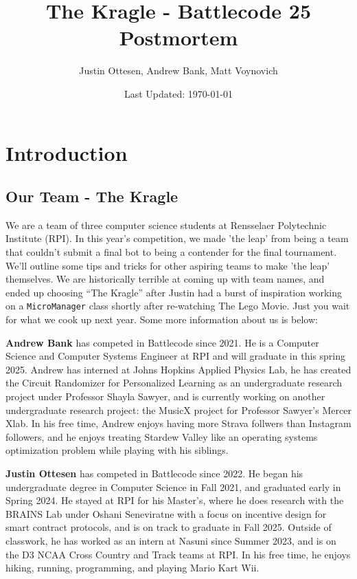 \documentclass{article}
\title{The Kragle - Battlecode 25 Postmortem}
\author{Justin Ottesen, Andrew Bank, Matt Voynovich}
\date{Last Updated: \today}
\begin{document}
  \maketitle

  \section{Introduction}  

  \subsection{Our Team - The Kragle}

  We are a team of three computer science students at Rensselaer Polytechnic Institute (RPI). In this year's competition, we made 'the leap' from being a team that couldn't submit a final bot to being a contender for the final tournament. We'll outline some tips and tricks for other aspiring teams to make 'the leap' themselves. We are historically terrible at coming up with team names, and ended up choosing ``The Kragle'' after Justin had a burst of inspiration working on a \verb|MicroManager| class shortly after re-watching The Lego Movie. Just you wait for what we cook up next year. Some more information about us is below:
  
  \medskip

  \textbf{Andrew Bank} has competed in Battlecode since 2021. He is a Computer Science and Computer Systems Engineer at RPI and will graduate in this spring 2025. Andrew has interned at Johns Hopkins Applied Physics Lab, he has created the Circuit Randomizer for Personalized Learning as an undergraduate research project under Professor Shayla Sawyer, and is currently working on another undergraduate research project: the MusicX project for Professor Sawyer's Mercer Xlab. In his free time, Andrew enjoys having more Strava follwers than Instagram followers, and he enjoys treating Stardew Valley like an operating systems optimization problem while playing with his siblings.

  \medskip

  \textbf{Justin Ottesen} has competed in Battlecode since 2022. He began his undergraduate degree in Computer Science in Fall 2021, and graduated early in Spring 2024. He stayed at RPI for his Master's, where he does research with the BRAINS Lab under Oshani Seneviratne with a focus on incentive design for smart contract protocols, and is on track to graduate in Fall 2025. Outside of classwork, he has worked as an intern at Nasuni since Summer 2023, and is on the D3 NCAA Cross Country and Track teams at RPI. In his free time, he enjoys hiking, running, programming, and playing Mario Kart Wii.
\end{document}
